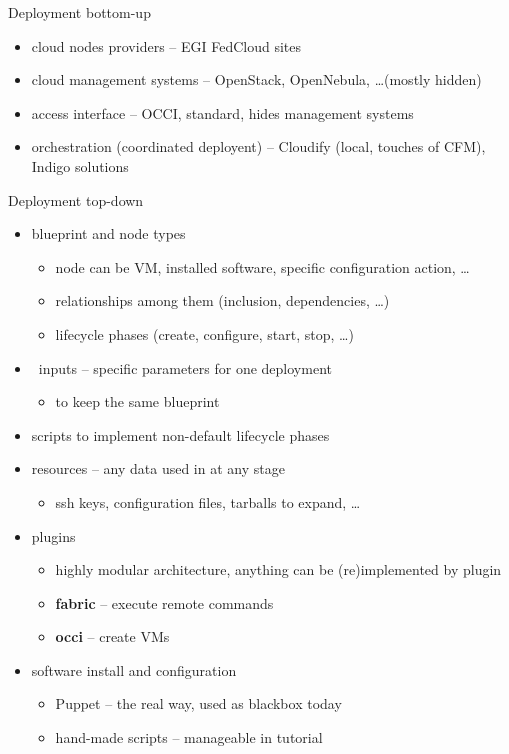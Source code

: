 \documentclass[smaller,t]{beamer}
\begin{document}
\begin{frame}{Deployment bottom-up}
\begin{itemize}
\item cloud nodes providers -- EGI FedCloud sites
\item cloud management systems -- OpenStack, OpenNebula, \dots (mostly hidden)
\item access interface -- OCCI, standard, hides management systems
\item orchestration (coordinated deployent) -- Cloudify (local, touches of CFM), Indigo solutions
\end{itemize}

\end{frame}

\begin{frame}{Deployment top-down}
\begin{itemize}
\item blueprint and node types
\begin{itemize}
\item node can be VM, installed software, specific configuration action, \dots
\item relationships among them (inclusion, dependencies, \dots)
\item lifecycle phases (create, configure, start, stop, \dots)
\end{itemize}
\item  inputs -- specific parameters for one deployment
\begin{itemize}
\item to keep the same blueprint
\end{itemize}
\item scripts to implement non-default lifecycle phases
\item resources -- any data used in at any stage
\begin{itemize}
\item ssh keys, configuration files, tarballs to expand, \dots
\end{itemize}
\item plugins
\begin{itemize}
\item highly modular architecture, anything can be (re)implemented by plugin
\item \textbf{fabric} -- execute remote commands
\item \textbf{occi} -- create VMs
\end{itemize}
\item software install and configuration
\begin{itemize}
\item Puppet -- the real way, used as blackbox today
\item hand-made scripts -- manageable in tutorial
\end{itemize}
\end{itemize}

\end{frame}
\end{document}
